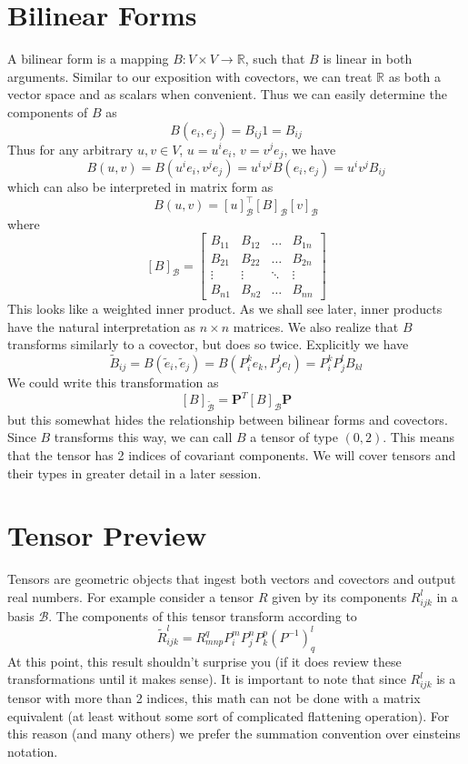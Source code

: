 \documentclass[a4paper]{article}
\begin{document}
\section*{Bilinear Forms}%
A bilinear form is a mapping $B: V \times V \rightarrow \mathds{R}$, such that $B$ is linear in both arguments. Similar to our exposition with covectors, we can treat $\mathds{R}$ as both a vector space and as scalars when convenient. Thus we can easily determine the components of $B$ as
\[
  B(e_i, e_j) = B_{ij} 1 = B_{ij}
\]
Thus for any arbitrary $u,v \in V$, $u = u^ie_i$, $v = v^je_j$, we have
\[
  B(u,v) = B(u^ie_i, v^je_j) = u^iv^j B(e_i, e_j) =  u^iv^j B_{ij}
\]
which can also be interpreted in matrix form as 
\[
  B(u,v) = \left[ u \right]_{\mathcal{B}}^\top \left[B\right]_{\mathcal{B}} \left[ v \right]_{\mathcal{B}}
\]
where
\[
  \left[B\right]_{\mathcal{B}} =
  \begin{bmatrix}
    B_{11} & B_{12} & \dots & B_{1n} \\
    B_{21} & B_{22} & \dots & B_{2n} \\
    \vdots & \vdots & \ddots & \vdots \\
    B_{n1} & B_{n2} & \dots & B_{nn}
  \end{bmatrix}
\]
This looks like a weighted inner product. As we shall see later, inner products have the natural interpretation as $n\times n$ matrices. We also realize that $B$ transforms similarly to a covector, but does so twice. Explicitly we have
\[
  \tilde{B}_{ij} = B(\tilde{e}_i, \tilde{e}_j) = B(P_i^k e_k, P_j^l e_l) = P_i^k P_j^l B_{kl}
\]
We could write this transformation as
\[
  \left[ B \right]_{\tilde{\mathcal{B}}} = \bm{P}^T \left[ B \right]_{\mathcal{B}} \bm{P}
\]
but this somewhat hides the relationship between bilinear forms and covectors. Since $B$ transforms this way, we can call $B$ a tensor of type $(0,2)$. This means that the tensor has 2 indices of covariant components. We will cover tensors and their types in greater detail in a later session.

\section*{Tensor Preview}%
Tensors are geometric objects that ingest both vectors and covectors and output real numbers. For example consider a tensor $R$ given by its components $R_{ijk}^l$ in a basis $\mathcal{B}$. The components of this tensor transform  according to
\[
  \tilde{R}_{ijk}^l = R_{mnp}^q P_i^m P_j^n P_k^p (P^{-1})_q^l
\]
At this point, this result shouldn't surprise you (if it does review these transformations until it makes sense). It is important to note that since $R_{ijk}^l$ is a tensor with more than 2 indices, this math can not be done with a matrix equivalent (at least without some sort of complicated flattening operation). For this reason (and many others) we prefer the summation convention over einsteins notation.
\end{document}
